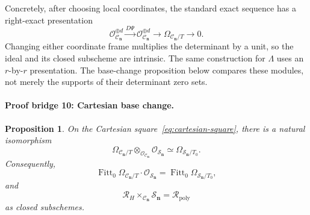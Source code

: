 \documentclass[11pt]{article}
\newtheorem{proposition}[theorem]{Proposition}
\theoremstyle{definition}
\theoremstyle{remark}
\newcommand{\cC}{\mathcal C}
\newcommand{\cR}{\mathcal R}
\newcommand{\cS}{\mathcal S}
\newcommand{\bn}{\mathbf n}
\newcommand{\Fitt}{\operatorname{Fitt}}
\begin{document}
Concretely, after choosing local coordinates, the standard exact sequence
has a right-exact presentation
\[
  \mathcal O_{\cC_{\bn}}^{\oplus d}
  \xrightarrow{D\Psi}
  \mathcal O_{\cC_{\bn}}^{\oplus d}
  \longrightarrow
  \Omega_{\cC_{\bn}/T}
  \longrightarrow0.
\]
Changing either coordinate frame multiplies the determinant by a unit, so
the ideal and its closed subscheme are intrinsic.  The same construction
for $\Lambda$ uses an $r$-by-$r$ presentation.  The base-change proposition
below compares these modules, not merely the supports of their determinant
zero sets.

\paragraph{Proof bridge 10: Cartesian base change.}

\begin{proposition}
\label{prop:fitting-basechange}
On the Cartesian square~\eqref{eq:cartesian-square}, there is a natural
isomorphism
\[
  \Omega_{\cC_{\bn}/T}
  \otimes_{\mathcal O_{\cC_{\bn}}}
  \mathcal O_{\cS_{\bn}}
  \simeq
  \Omega_{\cS_{\bn}/T_0}.
\]
Consequently,
\[
  \Fitt_0\Omega_{\cC_{\bn}/T}\cdot
  \mathcal O_{\cS_{\bn}}
  =
  \Fitt_0\Omega_{\cS_{\bn}/T_0},
\]
and
\[
  \cR_H\times_{\cC_{\bn}}\cS_{\bn}
  =
  \cR_{\mathrm{poly}}
\]
as closed subschemes.
\end{proposition}
\end{document}
